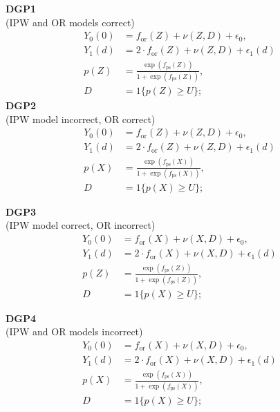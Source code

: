 \begin{multicols}{2}
\textbf{DGP1} \\
(IPW and OR models correct)
\begin{align*}
    Y_0(0) &= f_{\text{or}}(Z) + \nu(Z, D) + \epsilon_0, \\
    Y_1(d) &= 2 \cdot f_{\text{or}}(Z) + \nu(Z, D) + \epsilon_1(d) \\
    p(Z) &= \frac{\exp \left( f_{\text{ps}}(Z) \right)}{1 + \exp \left( f_{\text{ps}}(Z) \right)}, \\
    D &= 1\{ p(Z) \geq U \};
\end{align*}
\textbf{DGP2} \\
(IPW model incorrect, OR correct)
\begin{align*}
    Y_0(0) &= f_{\text{or}}(Z) + \nu(Z, D) + \epsilon_0, \\
    Y_1(d) &= 2 \cdot f_{\text{or}}(Z) + \nu(Z, D) + \epsilon_1(d) \\
    p(X) &= \frac{\exp \left( f_{\text{ps}}(X) \right)}{1 + \exp \left( f_{\text{ps}}(X) \right)}, \\
    D &= 1\{ p(X) \geq U \};
\end{align*}

\columnbreak

\textbf{DGP3}\\
(IPW model correct, OR incorrect)
\begin{align*}
    Y_0(0) &= f_{\text{or}}(X) + \nu(X, D) + \epsilon_0, \\
    Y_1(d) &= 2 \cdot f_{\text{or}}(X) + \nu(X, D) + \epsilon_1(d) \\
    p(Z) &= \frac{\exp \left( f_{\text{ps}}(Z) \right)}{1 + \exp \left( f_{\text{ps}}(Z) \right)}, \\
    D &= 1\{ p(X) \geq U \};
\end{align*}

\textbf{DGP4 } \\
(IPW and OR models incorrect)
\begin{align*}
    Y_0(0) &= f_{\text{or}}(X) + \nu(X, D) + \epsilon_0, \\
    Y_1(d) &= 2 \cdot f_{\text{or}}(X) + \nu(X, D) + \epsilon_1(d) \\
    p(X) &= \frac{\exp \left( f_{\text{ps}}(X) \right)}{1 + \exp \left( f_{\text{ps}}(X) \right)}, \\
    D &= 1\{ p(X) \geq U \};
\end{align*}

\end{multicols}

